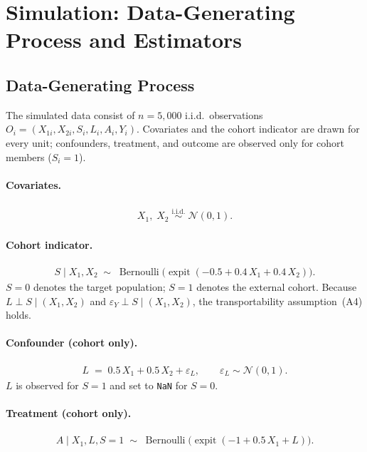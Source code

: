 \section*{Simulation: Data-Generating Process and Estimators}

\subsection*{Data-Generating Process}

The simulated data consist of $n = 5{,}000$ i.i.d.\ observations
$O_i = (X_{1i}, X_{2i}, S_i, L_i, A_i, Y_i)$.
Covariates and the cohort indicator are drawn for every unit;
confounders, treatment, and outcome are observed only for cohort members
($S_i = 1$).

\paragraph{Covariates.}
\begin{align}
  X_1,\; X_2 \;\overset{\text{i.i.d.}}{\sim}\; \mathcal{N}(0,1).
\end{align}

\paragraph{Cohort indicator.}
\begin{align}
  S \mid X_1, X_2 \;\sim\; \operatorname{Bernoulli}\!\bigl(
    \operatorname{expit}(-0.5 + 0.4\,X_1 + 0.4\,X_2)\bigr).
\end{align}
$S = 0$ denotes the target population; $S = 1$ denotes the external cohort.
Because $L \perp S \mid (X_1, X_2)$ and $\varepsilon_Y \perp S \mid
(X_1, X_2)$, the transportability assumption~(A4) holds.

\paragraph{Confounder (cohort only).}
\begin{align}
  L \;=\; 0.5\,X_1 + 0.5\,X_2 + \varepsilon_L, \qquad
  \varepsilon_L \sim \mathcal{N}(0,1).
\end{align}
$L$ is observed for $S = 1$ and set to \texttt{NaN} for $S = 0$.

\paragraph{Treatment (cohort only).}
\begin{align}
  A \mid X_1, L, S=1 \;\sim\; \operatorname{Bernoulli}\!\bigl(
    \operatorname{expit}(-1 + 0.5\,X_1 + L)\bigr).
\end{align}

